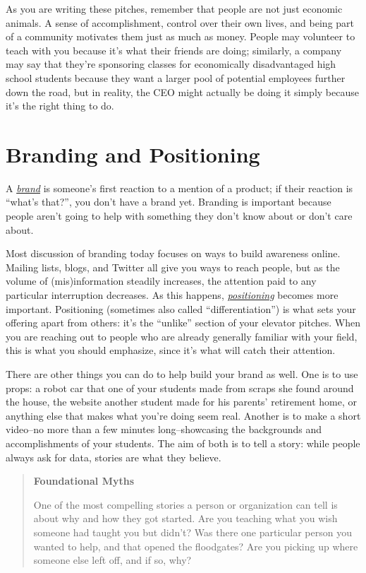 \documentclass[10pt,statementpaper]{memoir}
\begin{document}
As you are writing these pitches, remember that people are not just
economic animals. A sense of accomplishment, control over their own
lives, and being part of a community motivates them just as much as
money. People may volunteer to teach with you because it's what their
friends are doing; similarly, a company may say that they're sponsoring
classes for economically disadvantaged high school students because they
want a larger pool of potential employees further down the road, but in
reality, the CEO might actually be doing it simply because it's the
right thing to do.

\section{Branding and Positioning}\label{branding-and-positioning}

A \emph{\href{gloss.html\#brand}{brand}} is someone's first reaction to
a mention of a product; if their reaction is ``what's that?'', you don't
have a brand yet. Branding is important because people aren't going to
help with something they don't know about or don't care about.

Most discussion of branding today focuses on ways to build awareness
online. Mailing lists, blogs, and Twitter all give you ways to reach
people, but as the volume of (mis)information steadily increases, the
attention paid to any particular interruption decreases. As this
happens, \emph{\href{gloss.html\#positioning}{positioning}} becomes more
important. Positioning (sometimes also called ``differentiation'') is
what sets your offering apart from others: it's the ``unlike'' section
of your elevator pitches. When you are reaching out to people who are
already generally familiar with your field, this is what you should
emphasize, since it's what will catch their attention.

There are other things you can do to help build your brand as well. One
is to use props: a robot car that one of your students made from scraps
she found around the house, the website another student made for his
parents' retirement home, or anything else that makes what you're doing
seem real. Another is to make a short video--no more than a few minutes
long--showcasing the backgrounds and accomplishments of your students.
The aim of both is to tell a story: while people always ask for data,
stories are what they believe.

\begin{quote}
\textbf{Foundational Myths}

One of the most compelling stories a person or organization can tell is
about why and how they got started. Are you teaching what you wish
someone had taught you but didn't? Was there one particular person you
wanted to help, and that opened the floodgates? Are you picking up where
someone else left off, and if so, why?
\end{quote}
\end{document}
